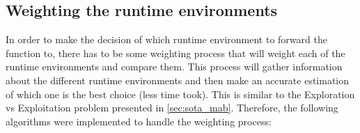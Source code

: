 

\subsection{Weighting the runtime environments}

In order to make the decision of which runtime environment to forward the function
to, there has to be some weighting process that will weight each of the runtime
environments and compare them. This process will gather information about the
different runtime environments and then make an accurate estimation of which one
is the best choice (less time took). This is similar to the Exploration vs
Exploitation problem presented in \ref{sec:sota_mab}. Therefore, the following
algorithms were implemented to handle the weighting process:

